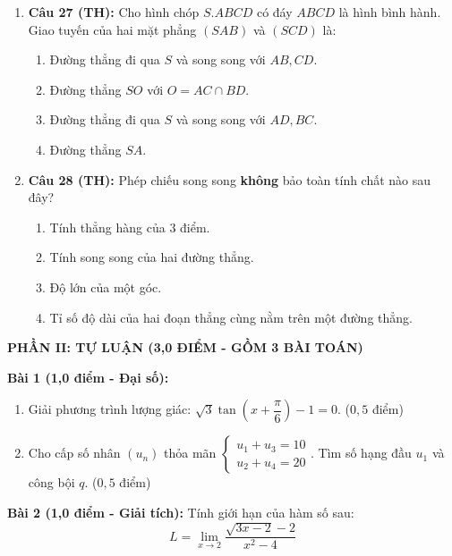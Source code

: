 \documentclass[12pt, a4paper]{article}
\begin{document}
\begin{enumerate}[leftmargin=0.8cm]
    \item \textbf{Câu 27 (TH):} Cho hình chóp $S.ABCD$ có đáy $ABCD$ là hình bình hành. Giao tuyến của hai mặt phẳng $(SAB)$ và $(SCD)$ là:
    \begin{enumerate}[label=\Alph*., leftmargin=0.8cm]
        \item Đường thẳng đi qua $S$ và song song với $AB, CD$.
        \item Đường thẳng $SO$ với $O = AC \cap BD$.
        \item Đường thẳng đi qua $S$ và song song với $AD, BC$.
        \item Đường thẳng $SA$.
    \end{enumerate}

    \item \textbf{Câu 28 (TH):} Phép chiếu song song \textbf{không} bảo toàn tính chất nào sau đây?
    \begin{enumerate}[label=\Alph*., leftmargin=0.8cm]
        \item Tính thẳng hàng của 3 điểm.
        \item Tính song song của hai đường thẳng.
        \item Độ lớn của một góc.
        \item Tỉ số độ dài của hai đoạn thẳng cùng nằm trên một đường thẳng.
    \end{enumerate}
\end{enumerate}

\vspace{10pt}
\begin{center}
    \textbf{PHẦN II: TỰ LUẬN (3,0 ĐIỂM - GỒM 3 BÀI TOÁN)}
\end{center}

\noindent \textbf{Bài 1 (1,0 điểm - Đại số):}
\begin{enumerate}[leftmargin=0.6cm]
    \item[a)] Giải phương trình lượng giác: $\sqrt{3}\tan\left(x + \dfrac{\pi}{6}\right) - 1 = 0$. ($0{,}5$ điểm)
    \item[b)] Cho cấp số nhân $(u_n)$ thỏa mãn $\begin{cases} u_1 + u_3 = 10 \\ u_2 + u_4 = 20 \end{cases}$. Tìm số hạng đầu $u_1$ và công bội $q$. ($0{,}5$ điểm)
\end{enumerate}

\noindent \textbf{Bài 2 (1,0 điểm - Giải tích):}
Tính giới hạn của hàm số sau:
$$L = \lim_{x \to 2} \dfrac{\sqrt{3x - 2} - 2}{x^2 - 4}$$
\end{document}
